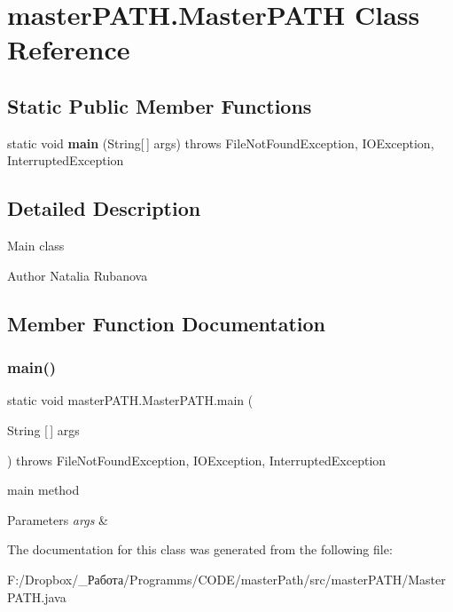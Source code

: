 \section{master\+P\+A\+T\+H.\+Master\+P\+A\+TH Class Reference}
\label{classmaster_p_a_t_h_1_1_master_p_a_t_h}
\subsection*{Static Public Member Functions}
\begin{DoxyCompactItemize}
\item 
static void \textbf{ main} (String[$\,$] args)  throws File\+Not\+Found\+Exception, I\+O\+Exception, Interrupted\+Exception 
\end{DoxyCompactItemize}


\subsection{Detailed Description}
Main class \begin{DoxyAuthor}{Author}
Natalia Rubanova 
\end{DoxyAuthor}


\subsection{Member Function Documentation}
\mbox{\label{classmaster_p_a_t_h_1_1_master_p_a_t_h_a83b37a64dbcce1092579aea24b717098}} 
\subsubsection{main()}
{\footnotesize\ttfamily static void master\+P\+A\+T\+H.\+Master\+P\+A\+T\+H.\+main (\begin{DoxyParamCaption}\item[{String [$\,$]}]{args }\end{DoxyParamCaption}) throws File\+Not\+Found\+Exception, I\+O\+Exception, Interrupted\+Exception\hspace{0.3cm}{\ttfamily [static]}}

main method 
\begin{DoxyParams}{Parameters}
{\em args} & \\
\hline
\end{DoxyParams}


The documentation for this class was generated from the following file\+:\begin{DoxyCompactItemize}
\item 
F\+:/\+Dropbox/\+\_\+Работа/\+Programms/\+C\+O\+D\+E/master\+Path/src/master\+P\+A\+T\+H/Master\+P\+A\+T\+H.\+java\end{DoxyCompactItemize}
